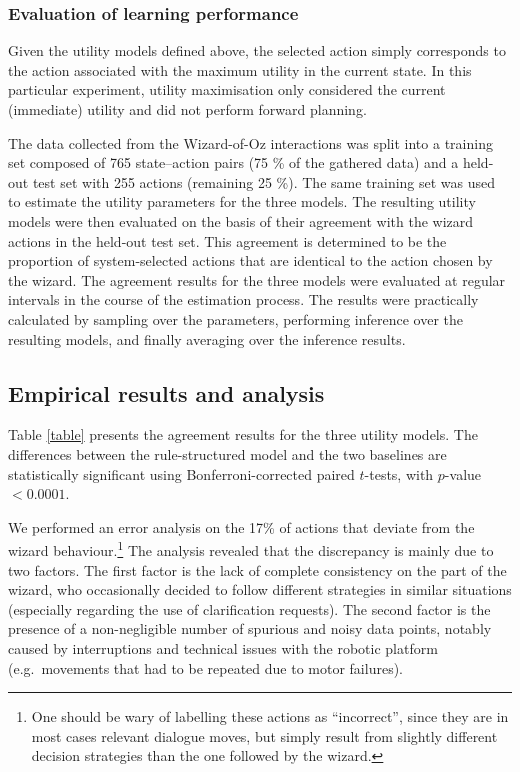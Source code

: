 
\subsubsection*{Evaluation of learning performance}
Given the utility models defined above, the selected action simply corresponds to the action associated with the maximum utility in the current state. In this particular experiment, utility maximisation only considered the current (immediate) utility and did not perform forward planning.

The data collected from the Wizard-of-Oz interactions was split into a training set composed of 765 state--action pairs (75 \% of the gathered data) and a held-out test set with 255 actions (remaining 25 \%). The same training set was used to estimate the utility parameters for the three models.  The resulting utility models were then evaluated on the basis of their agreement with the wizard actions in the held-out test set. This agreement is determined to be the proportion of system-selected actions that are identical to the action chosen by the wizard. The agreement results for the three models were evaluated at regular intervals in the course of the estimation process. The results were practically calculated by sampling over the parameters, performing inference over the resulting models, and finally averaging over the inference results.  

\subsection{Empirical results and analysis}
\label{sec:wozlearning-experiments-results}

Table \ref{table} presents the agreement results for the three utility models. The differences between the rule-structured model and the two baselines are statistically significant using Bonferroni-corrected paired $t$-tests, with $p$-value $< 0.0001$.   

We performed an error analysis on the 17\% of actions that deviate from the wizard behaviour.\footnote{One should be wary of labelling these actions as ``incorrect'', since they are in most cases relevant dialogue moves, but simply result from slightly different decision strategies than the one followed by the wizard.} The analysis revealed that the discrepancy is mainly due to two factors.  The first factor is the lack of complete consistency on the part of the wizard, who occasionally decided to follow different strategies in similar situations (especially regarding the use of clarification requests). The second factor is the presence of a non-negligible number of spurious and noisy data points, notably caused by interruptions and technical issues with the robotic platform (e.g.\ movements that had to be repeated due to motor failures).

